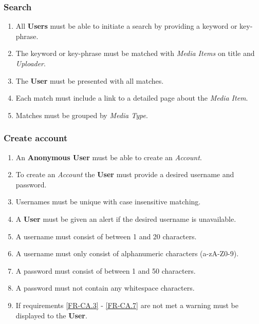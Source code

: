 

%

\subsubsection {Search}

\begin{enumerate}[label=FR-\twodigits*]

	\item All \textbf{Users} must be able to initiate a search by providing a keyword or key-phrase.
	\item The keyword or key-phrase must be matched with \textit{Media Items} on title and \textit{Uploader}.
	\item The \textbf{User} must be presented with all matches.
	\item Each match must include a link to a detailed page about the \textit{Media Item}.
	\item Matches must be grouped by \textit{Media Type}. 
\end{enumerate}	
			
\subsubsection{Create account}

\begin{enumerate}[label=FR-\twodigits*, resume]
	\item An \textbf{Anonymous User} must be able to create an \textit{Account}.
	\item To create an \textit{Account} the \textbf{User} must provide a desired username and password.
	\item Usernames must be unique with case insensitive matching. \label{FR-CA.3}
	\item A \textbf{User} must be given an alert if the desired username is unavailable.
	\item A username must consist of between 1 and 20 characters.
	\item A username must only consist of alphanumeric characters (a-zA-Z0-9).
	\item A password must consist of between 1 and 50 characters. 
	\label{FR-CA.6}
	\item A password must not contain any whitespace characters. \label{FR-CA.7}
	\item If requirements \ref{FR-CA.3} - \ref{FR-CA.7} are not met a warning must be displayed to the \textbf{User}.
\end{enumerate}
	
